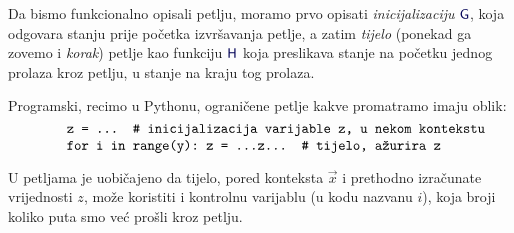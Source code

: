 
Da bismo funkcionalno opisali petlju, moramo prvo opisati \emph{inicijalizaciju} $\f G$, koja odgovara stanju prije početka izvršavanja petlje, a zatim \emph{tijelo} (ponekad ga zovemo i \emph{korak}) petlje kao funkciju $\f H$ koja preslikava stanje na početku jednog prolaza kroz petlju, u stanje na kraju tog prolaza. %

Programski, recimo u Pythonu, ograničene petlje kakve promatramo imaju oblik:
\begin{equation}
	\begin{minipage}{0.8\textwidth}
\begin{verbatim}
z = ...  # inicijalizacija varijable z, u nekom kontekstu
for i in range(y): z = ...z...  # tijelo, ažurira z
\end{verbatim}
	\end{minipage}
\end{equation}

U petljama je uobičajeno da tijelo, pored konteksta $\vec x$ i prethodno izračunate vrijednosti $z$, može koristiti i kontrolnu varijablu (u kodu nazvanu $i$), koja broji koliko puta smo već prošli kroz petlju.


